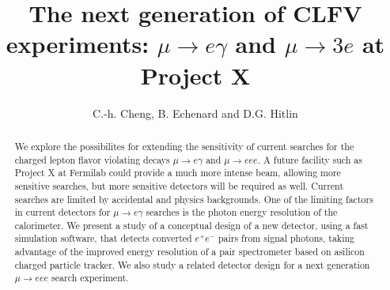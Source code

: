 \documentclass[12pt]{article}
\begin{document}

\title{The next generation of 
CLFV experiments:\break
$\mu \to e \gamma$ and  $\mu \to 3e$ at Project X}

\author{C.-h. Cheng, B. Echenard and D.G. Hitlin}

\maketitle

\begin{abstract}
We explore the possibilites for extending the sensitivity of current searches for the charged lepton flavor violating decays $\mu\to e \gamma$ and  $\mu\to eee$.  A future facility such as Project X at 
Fermilab could provide a much more intense beam, allowing more sensitive searches, but more
sensitive detectors will be required as well. Current searches are limited by accidental and physics backgrounds. One of the limiting factors in current detectors
for $\mu \to e \gamma$ searches is the photon energy resolution of the calorimeter. We present a study of a
conceptual design of a new detector, using a fast simulation software, that
detects converted $e^+e^-$ pairs from signal photons, taking advantage of the  improved
energy resolution of a pair spectrometer based on asilicon charged particle tracker.  We also study
a related detector design for a next generation $\mu\to eee$ search experiment.
\end{abstract}








\end{document}
